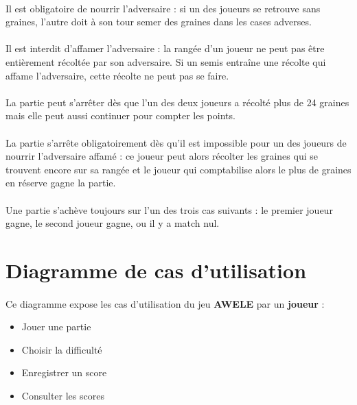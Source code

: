 \documentclass{article}
\begin{document}
    \paragraph{}
    Il est obligatoire de nourrir l'adversaire : si un des joueurs se retrouve sans graines, l'autre doit à son tour semer des graines dans les cases adverses.

    \paragraph{}
    Il est interdit d'affamer l'adversaire : la rangée d'un joueur ne peut pas être entièrement récoltée par son adversaire. Si un semis entraîne une récolte qui affame l'adversaire, cette récolte ne peut pas se faire.

    \paragraph{}
    La partie peut s'arrêter dès que l'un des deux joueurs a récolté plus de 24 graines mais elle peut aussi continuer pour compter les points.
    
    \paragraph{}
    La partie s'arrête obligatoirement dès qu'il est impossible pour un des joueurs de nourrir l'adversaire affamé : ce joueur peut alors récolter les graines qui se trouvent encore sur sa rangée et le joueur qui comptabilise alors le plus de graines en réserve gagne la partie.

    \paragraph{}
    Une partie s'achève toujours sur l'un des trois cas suivants : le premier joueur gagne, le second joueur gagne, ou il y a match nul.


    \newpage
    \section{Diagramme de cas d'utilisation}

    \paragraph{}
    Ce diagramme expose les cas d'utilisation du jeu \textbf{AWELE} par un \textbf{joueur} :
    \begin{itemize}
        \item Jouer une partie
        \item Choisir la difficulté
        \item Enregistrer un score
        \item Consulter les scores
    \end{itemize}
\end{document}
